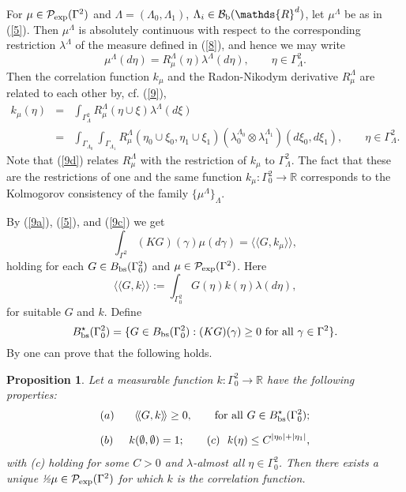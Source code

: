 \documentclass[reqno,11pt]{amsart}
\newtheorem{proposition}[theorem]{Proposition}
\theoremstyle{definition}
\theoremstyle{remark}
\numberwithin{equation}{section}
\begin{document}
For $\mu \in \mathcal{P}_{\rm exp}(\Gamma^2)$ and $\Lambda
=(\Lambda_0, \Lambda_1)$, $\Lambda_i \in \mathcal{B}_{\rm
b}(\mathds{R}^d)$, let $\mu^\Lambda$ be as in (\ref{5}). Then
$\mu^\Lambda$ is absolutely continuous with respect to the
corresponding restriction  $\lambda^\Lambda$ of the measure defined
in (\ref{8}), and hence we may write
\begin{equation}
\label{9c} \mu^\Lambda (d \eta ) = R^\Lambda_\mu (\eta)
\lambda^\Lambda ( d \eta), \qquad \eta \in \Gamma^2_\Lambda.
\end{equation}
Then the correlation function $k_\mu$ and the Radon-Nikodym
derivative $R_\mu^\Lambda$ are related to each other by, cf.
(\ref{9}),
\begin{eqnarray}
  \label{9d}
k_\mu(\eta) & = & \int_{\Gamma^2_\Lambda} R^\Lambda_\mu (\eta \cup
\xi) \lambda^\Lambda ( d\xi)\\[.2cm]& = & \int_{\Gamma_{\Lambda_0}}
\int_{\Gamma_{\Lambda_1}} R^\Lambda_\mu (\eta_0 \cup\xi_0, \eta_1
\cup \xi_1) (\lambda_0^{\Lambda_0}  \otimes \lambda_1^{\Lambda_1})
(d\xi_0, d \xi_1), \qquad \eta \in \Gamma^2_\Lambda. \nonumber
\end{eqnarray}
Note that (\ref{9d}) relates $R^\Lambda_\mu$ with the restriction of
$k_\mu$ to $\Gamma_\Lambda^2$. The fact that these are the
restrictions of one and the same function
$k_\mu:\Gamma_0^2\to\mathds{R}$ corresponds to the Kolmogorov
consistency of the family $\{\mu^\Lambda\}_{\Lambda}$.

By (\ref{9a}), (\ref{5}), and (\ref{9c}) we get
\begin{equation*}
  
\int_{\Gamma^2} (KG)(\gamma) \mu(d\gamma) = \langle \! \langle G,
k_\mu \rangle \!\rangle,
\end{equation*}
holding for each $G\in B_{\rm bs}(\Gamma_0^2)$ and $\mu \in
\mathcal{P}_{\rm exp}(\Gamma^2)$. Here
\begin{equation}
  \label{9f}
\langle \! \langle G, k \rangle \!\rangle := \int_{\Gamma_0^2}
G(\eta) k(\eta) \lambda (d \eta),
\end{equation}
for suitable $G$ and $k$. Define
\begin{equation}
  \label{9g}
B^\star_{\rm bs} (\Gamma_0^2) =\{ G\in B_{\rm bs}(\Gamma_0^2):
(KG)(\gamma) \geq 0 \ {\rm for} \ {\rm all} \ \gamma\in \Gamma^2\}.
\end{equation}
By \cite[Theorems 6.1 and 6.2 and Remark 6.3]{Tobi} one can prove
that the following holds.
\begin{proposition}
  \label{Gpn}
Let  a measurable function $k : \Gamma_0^2 \to \mathds{R}$  have the
following properties:
\begin{eqnarray}
  \label{9h}
& (a) & \ \langle \! \langle G, k \rangle \!\rangle \geq 0, \qquad
{\rm for} \ {\rm all} \ G\in B^\star_{\rm bs} (\Gamma_0^2);\\[.2cm]
& (b) & \ k(\emptyset, \emptyset) = 1; \qquad (c) \ \ k(\eta) \leq
 C^{|\eta_0|+|\eta_1|} ,
\nonumber
\end{eqnarray}
with (c) holding for some $C >0$ and $\lambda$-almost all $\eta\in
\Gamma_0^2$. Then there exists a unique ½$\mu \in \mathcal{P}_{\rm
exp}(\Gamma^2)$ for which $k$ is the correlation function.
\end{proposition}
\end{document}
